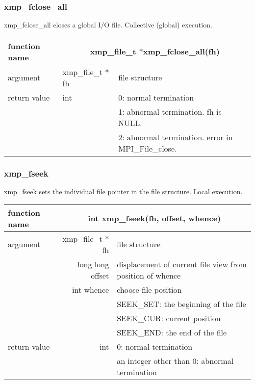    \subsubsection{xmp\_fclose\_all}
   xmp\_fclose\_all closes a global I/O file. Collective (global) execution.

   \begin{table}[h]
    \begin{center}
     \begin{tabular}{|l|l|p{80mm}|}
      \hline
      {\bf function name}  & \multicolumn{2}{c|}{\bf xmp\_file\_t
      $*$xmp\_fclose\_all(fh)} \\ \hline \hline
      argument & xmp\_file\_t $*$fh & file structure \\ \hline
      return value & int & 0: normal termination \\
      &  & 1: abnormal termination. fh is NULL. \\
      &  & 2: abnormal termination. error in MPI\_File\_close. \\ \hline
      \end{tabular}
     \end{center}
    \label{tb:close}
   \end{table}

   \subsubsection{xmp\_fseek}
   xmp\_fseek sets the individual file pointer in the file structure. Local execution.

   \begin{table}[h]
    \begin{center}
     \begin{tabular}{|l|r|p{70mm}|}
      \hline
      {\bf function name}  & \multicolumn{2}{c|}{\bf int xmp\_fseek(fh,
      offset, whence)}  \\ \hline \hline
      argument & xmp\_file\_t $*$fh & file structure \\ \cline{2-3}
      & long long offset & displacement of current file view from
	      position of whence \\ \cline{2-3}
      & int whence & choose file position \\
      &  & SEEK\_SET: the beginning of the file \\ 
      &  & SEEK\_CUR: current position \\ 
      &  & SEEK\_END: the end of the file \\ \hline
      return value & int & 0: normal termination \\
      &  & an integer other than 0: abnormal termination \\ \hline
      \end{tabular}
     \end{center}
    \label{tb:aaa}
   \end{table}

